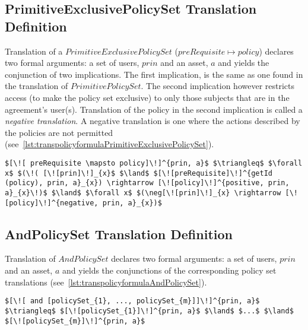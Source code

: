 \subsection{PrimitiveExclusivePolicySet Translation Definition}
Translation of a $PrimitiveExclusivePolicySet$ ($preRequisite \mapsto policy$) declares two formal arguments: a set of users, $prin$ and an asset, $a$ and yields the conjunction of two implications. The first implication, is the same as one found in the translation of $PrimitivePolicySet$. The second implication however restricts access (to make the policy set exclusive) to only those subjects that are in the agreement's user(s). Translation of the policy in the second implication is called a \emph{negative translation}. A negative translation is one where the actions described by the policies are not permitted (see~\ref{lst:transpolicyformulaPrimitiveExclusivePolicySet}).


\lstset{mathescape, language=AST}  
\begin{lstlisting}[frame=single, caption={Policy Set Translation Definition {$\colon$} PrimitiveExclusivePolicySet},label={lst:transpolicyformulaPrimitiveExclusivePolicySet}]
$[\![ preRequisite \mapsto policy]\!]^{prin, a}$ $\triangleq$ $\forall x$ $(\!( [\![prin]\!]_{x}$ $\land$ $[\![preRequisite]\!]^{getId (policy), prin, a}_{x}) \rightarrow [\![policy]\!]^{positive, prin, a}_{x}\!)$ $\land$ $\forall x$ $(\neg[\![prin]\!]_{x} \rightarrow [\![policy]\!]^{negative, prin, a}_{x})$
\end{lstlisting}

\subsection{AndPolicySet Translation Definition}
Translation of $AndPolicySet$ declares two formal arguments: a set of users, $prin$ and an asset, $a$ and yields the conjunctions of the corresponding policy set translations (see~\ref{lst:transpolicyformulaAndPolicySet}). 

\lstset{mathescape, language=AST}  
\begin{lstlisting}[frame=single, caption={Policy Set Translation Definition {$\colon$} AndPolicySet},label={lst:transpolicyformulaAndPolicySet}]
$[\![ and [policySet_{1}, ..., policySet_{m}]]\!]^{prin, a}$ $\triangleq$ $[\![policySet_{1}]\!]^{prin, a}$ $\land$ $...$ $\land$ $[\![policySet_{m}]\!]^{prin, a}$

\end{lstlisting}


